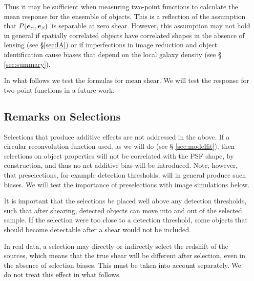 \documentclass[iop, twocolappendix, appendixfloats, numberedappendix, apj]{emulateapj}
\newcommand{\vest}{\mbox{\boldmath $e$}}
\newcommand{\mcalRscalarmean}{\mbox{$\langle R \rangle$}}
\newcommand{\probe}{\mbox{$P(\vest_\alpha, \vest_\beta)$}}
\begin{document}
Thus it may be sufficient when measuring two-point functions to calculate the
mean response for the ensemble of objects.  This is a reflection of the
assumption that \probe\ is separable at zero shear.  However, this
assumption may not hold in general if spatially correlated objects have
correlated shapes in the absence of lensing (see \S \ref{sec:IA}) or if
imperfections in image reduction and object identification cause
biases that depend on the local galaxy density (see \S
\ref{sec:summary}).


In what follows we test the formulas for mean shear.  We will test the
response for two-point functions in a future work.

\subsection{Remarks on Selections}

Selections that produce additive effects are not addressed in the above.  If a
circular reconvolution function used, as we will do (see \S
\ref{sec:modelfit}), then selections on object properties will not be
correlated with the PSF shape, by construction, and thus no net additive bias
will be introduced. Note, however, that preselections, for example detection
thresholds, will in general produce such biases.  We will test the importance
of preselections with image simulations below.


It is important that the selections be placed well above any detection
thresholds, such that after shearing, detected objects can move into and out
of the selected sample.  If the selection were too close to a detection
threshold, some objects that should become detectable after
a shear would not be included.

In real data, a selection may directly or indirectly select the redshift of the
sources, which means that the true shear will be different after selection,
even in the absence of selection biases.  This must be taken into account
separately.  We do not treat this effect in what follows.
\end{document}
